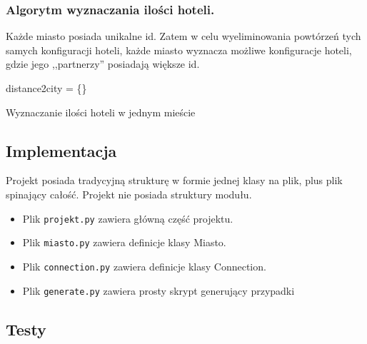 \documentclass[12pt,a4paper]{article}
\begin{document}
	\subsubsection*{Algorytm wyznaczania ilości hoteli.}
	
	Każde miasto posiada unikalne id. Zatem w celu wyeliminowania powtórzeń tych samych konfiguracji hoteli, każde miasto wyznacza możliwe konfiguracje hoteli, gdzie jego ,,partnerzy'' posiadają większe id.

	\begin{algorithm}[H]
		distance2city = \{\} 
		\caption{Wyznaczanie ilości hoteli w jednym mieście}
	\end{algorithm}

	\subsection*{Implementacja}

    Projekt posiada tradycyjną strukturę w formie jednej klasy na plik, plus 
    plik spinający całość. Projekt nie posiada struktury modułu.

    \begin{itemize}
        \item Plik \texttt{projekt.py} zawiera główną część projektu.
        
        \item Plik \texttt{miasto.py} zawiera definicje klasy Miasto.

        \item Plik \texttt{connection.py} zawiera definicje klasy Connection.

        \item Plik \texttt{generate.py} zawiera prosty skrypt generujący
            przypadki
    \end{itemize}

	\subsection*{Testy}
\end{document}
